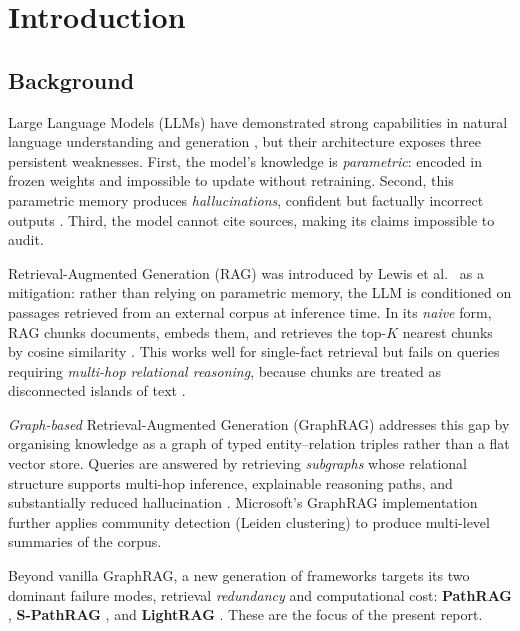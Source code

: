 \documentclass[12pt,a4paper,oneside]{report}
\begin{document}
\chapter{Introduction}
\label{ch:introduction}

\section{Background}

Large Language Models (LLMs) have demonstrated strong capabilities in natural
language understanding and generation \citep{yang2024}, but their architecture
exposes three persistent weaknesses. First, the model's knowledge is
\emph{parametric}: encoded in frozen weights and impossible to update without
retraining. Second, this parametric memory produces \emph{hallucinations},
confident but factually incorrect outputs \citep{tonmoy2024}. Third, the model
cannot cite sources, making its claims impossible to audit.

Retrieval-Augmented Generation (RAG) was introduced by Lewis et al.~\citep{lewis2020} as a
mitigation: rather than relying on parametric memory, the LLM is conditioned
on passages retrieved from an external corpus at inference time. In its
\emph{naive} form, RAG chunks documents, embeds them, and retrieves the
top-$K$ nearest chunks by cosine similarity \citep{gao2023,fan2024}. This
works well for single-fact retrieval but fails on queries requiring
\emph{multi-hop relational reasoning}, because chunks are treated as
disconnected islands of text \citep{han2025,edge2024}.

\emph{Graph-based} Retrieval-Augmented Generation (GraphRAG) addresses this
gap by organising knowledge as a graph of typed entity--relation triples
rather than a flat vector store. Queries are answered by retrieving
\emph{subgraphs} whose relational structure supports multi-hop inference,
explainable reasoning paths, and substantially reduced hallucination
\citep{han2025,peng2024,msresearch2024}. Microsoft's GraphRAG
implementation \citep{edge2024} further applies community detection
(Leiden clustering) to produce multi-level summaries of the corpus.

Beyond vanilla GraphRAG, a new generation of frameworks targets its two
dominant failure modes, retrieval \emph{redundancy} and computational
cost: \textbf{PathRAG} \citep{chen2025pathrag}, \textbf{S-PathRAG}
\citep{fu2026spathrag}, and \textbf{LightRAG} \citep{guo2025lightrag}. These
are the focus of the present report.
\end{document}
